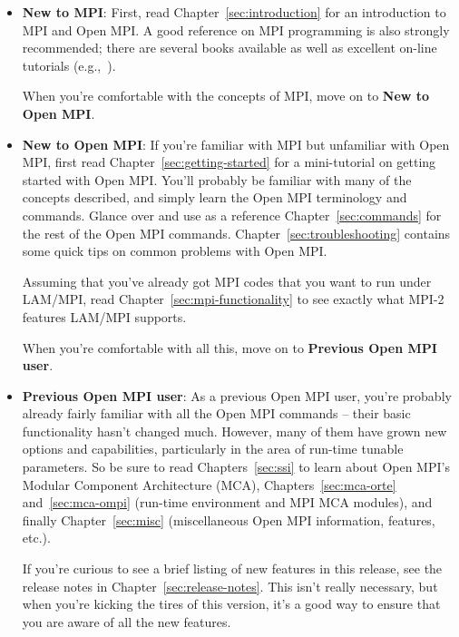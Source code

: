 \begin{itemize}
\item {\bf New to MPI}: First, read Chapter~\ref{sec:introduction} for
  an introduction to MPI and Open MPI.  A good reference on MPI
  programming is also strongly recommended; there are several books
  available as well as excellent on-line tutorials
  (e.g.,~\cite{gropp98:_mpi2,gropp94:_using_mpi,gropp99:_using_mpi_2,snir96:_mpi_the_compl_refer}).
  
  When you're comfortable with the concepts of MPI, move on to {\bf
    New to Open MPI}.

  \vspace{-3pt}

\item {\bf New to Open MPI}: If you're familiar with MPI but unfamiliar
  with Open MPI, first read Chapter~\ref{sec:getting-started} for a
  mini-tutorial on getting started with Open MPI.  You'll probably be
  familiar with many of the concepts described, and simply learn the
  Open MPI terminology and commands.  Glance over and use as a reference
  Chapter~\ref{sec:commands} for the rest of the Open MPI commands.
  Chapter~\ref{sec:troubleshooting} contains some quick tips on common
  problems with Open MPI.

  Assuming that you've already got MPI codes that you want to run
  under LAM/MPI, read Chapter~\ref{sec:mpi-functionality} to see
  exactly what MPI-2 features LAM/MPI supports.
  
  When you're comfortable with all this, move on to {\bf Previous Open
    MPI user}.
  
  \vspace{-3pt}
  
\item {\bf Previous Open MPI user}: As a previous Open MPI user,
  you're probably already fairly familiar with all the Open MPI
  commands -- their basic functionality hasn't changed much.  However,
  many of them have grown new options and capabilities, particularly
  in the area of run-time tunable parameters.  So be sure to read
  Chapters~\ref{sec:ssi} to learn about Open MPI's Modular Component
  Architecture (MCA), Chapters~\ref{sec:mca-orte}
  and~\ref{sec:mca-ompi} (run-time environment and MPI MCA modules),
  and finally Chapter~\ref{sec:misc} (miscellaneous Open MPI
  information, features, etc.).
  
  If you're curious to see a brief listing of new features in this
  release, see the release notes in Chapter~\ref{sec:release-notes}.
  This isn't really necessary, but when you're kicking the tires of
  this version, it's a good way to ensure that you are aware of all
  the new features.
  

\end{itemize}
